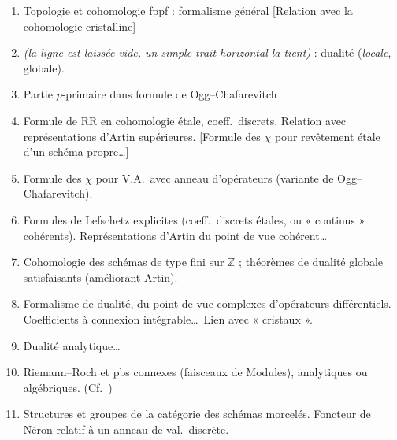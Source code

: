 \documentclass[11pt,a4paper]{article}
\begin{document}
\begin{enumerate}
\item[1)] Topologie et cohomologie fppf : formalisme général [Relation avec
la cohomologie cristalline]

\item[(2)] \emph{(la ligne est laissée vide, un simple trait horizontal la
tient)} : dualité (\emph{locale}, globale).

\marginal{[subordonné à 1), 11)]}

\item[(3)] Partie $p$-primaire dans formule de Ogg--Chafarevitch


\item[(4)] Formule de RR en cohomologie étale, coeff.\ discrets. Relation avec
représentations d'Artin supérieures. [Formule des $\chi$ pour revêtement étale
d'un schéma propre…]

\item[5)] Formule des $\chi$ pour V.A.\ avec anneau d'opérateurs (variante de
Ogg--Chafarevitch).

\item[6)] Formules de Lefschetz explicites (coeff.\ discrets étales, ou
« continus » cohérents). Représentations d'Artin du point de vue cohérent…

\item[(7)] Cohomologie des schémas de type fini sur $\mathbb{Z}$ ; théorèmes de
dualité globale satisfaisants (améliorant Artin).

\item[(8)] Formalisme de dualité, du point de vue complexes d'opérateurs
différentiels. Coefficients à connexion intégrable…\ Lien
avec « cristaux ».

\item[(9)] Dualité analytique…

\item[(10)] Riemann--Roch et pbs connexes (faisceaux de
Modules), analytiques ou algébriques. (Cf.\ )

\item[(11)] Structures et groupes de la catégorie des schémas morcelés.
Foncteur de Néron relatif à un anneau de val.\ discrète.
\end{enumerate}

\end{document}
